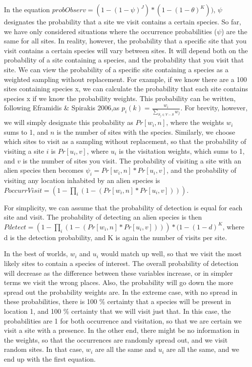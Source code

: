 \documentclass[]{article}
\begin{document}
In the equation
\(probObserv = (1 - (1 - \psi)^J) * (1 - (1 - \theta)^K))\), \(\psi\)
designates the probability that a site we visit contains a certain
species. So far, we have only considered situations where the occurrence
probabilities (\(\psi\)) are the same for all sites. In reality,
however, the probability that a specific site that you visit contains a
certain species will vary between sites. It will depend both on the
probability of a site containing a species, and the probability that you
visit that site. We can view the probability of a specific site
containing a species as a weighted sampling without replacement. For
example, if we know there are a 100 sites containing species x, we can
calculate the probability that each site contains species x if we know
the probability weights. This probability can be written, following
Eframidis \& Spirakis 2006,as
\(p_i(k) = \frac{w_i} {\sum_{S_j \in V - S} {w_j}}\). For brevity,
however, we will simply designate this probability as \(Pr[w_i, n]\),
where the weights \(w_i\) sums to 1, and \(n\) is the number of sites
with the species. Similarly, we choose which sites to visit as a
sampling without replacement, so that the probability of visiting a site
\(i\) is \(Pr[u_i, v]\), where \(u_i\) is the visitation weights, which
sums to 1, and \(v\) is the number of sites you visit. The probability
of visiting a site with an alien species then becomes
\(\psi_i = Pr[w_i, n] * Pr[u_i, v]\), and the probability of visiting
any location inhabited by an alien species is
\(PoccurrVisit = (1 - \prod_{i}^{}(1 - (Pr[w_i, n] * Pr[u_i, v])))\).

For simplicity, we can assume that the probability of detection is equal
for each site and visit. The probability of detecting an alien species
is then
\(Pdetect = (1 - \prod_{i}^{}(1 - (Pr[w_i, n] * Pr[u_i, v]))) * (1 - (1 - d)^K\),
where d is the detection probability, and K is again the number of
visits per site.

In the best of worlds, \(w_i\) and \(u_i\) would match up well, so that
we visit the most likely sites to contain a species of interest. The
overall probability of detection will decrease as the difference between
these variables increase, or in simpler terms we visit the wrong places.
Also, the probability will go down the more spread out the probability
weights are. In the extreme case, with no spread in these probabilities,
there is 100 \% certainty that a species will be present in location 1,
and 100 \% certainty that we will visit just that. In this case, the
probabilities are 1 for both occurrence and visitation, so that we are
certain we visit a site with a presence. In the other end, there might
be no information in the weights, so that the occurrences are randomly
spread out, and we visit random sites. In that case, \(w_i\) are all the
same and \(u_i\) are all the same, and we end up with the first
equation.
\end{document}
